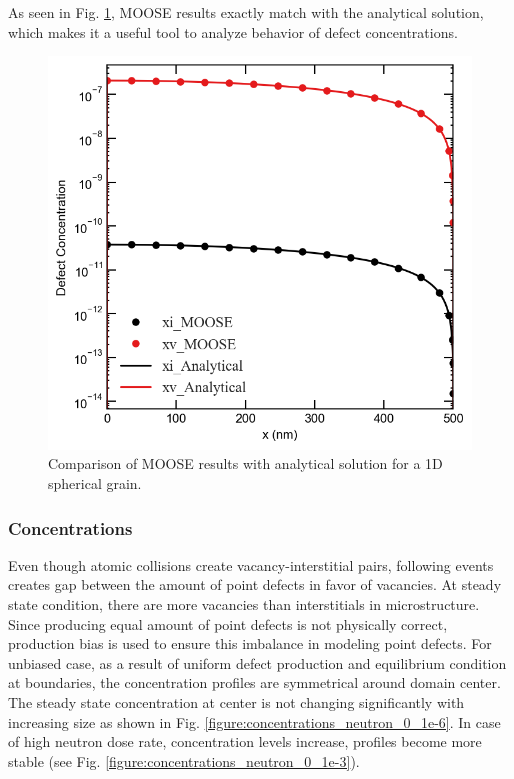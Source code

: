 \documentclass[a4paper]{article}
\begin{document}
  As seen in Fig. \ref{figure:concentrations_MOOSE_analytical}, MOOSE results exactly match with the analytical solution, which makes it a useful tool to analyze behavior of defect concentrations.
  \begin{figure}[h!]
    \centering
    \includegraphics[scale=0.55]{concentration_profiles_MOOSE_Analytical_Neutron_0}
    \caption{Comparison of MOOSE results with analytical solution for a 1D spherical grain.}
    \label{figure:concentrations_MOOSE_analytical}
  \end{figure}
    \subsubsection{Concentrations} \hspace{10pt}
    Even though atomic collisions create vacancy-interstitial pairs, following events creates gap between the amount of point defects in favor of vacancies. At steady state condition, there are more vacancies than interstitials in microstructure. Since producing equal amount of point defects is not physically correct, production bias is used to ensure this imbalance in modeling point defects. For unbiased case, as a result of uniform defect production and equilibrium condition at boundaries, the concentration profiles are symmetrical around domain center. The steady state concentration at center is not changing significantly with increasing size as shown in Fig. \ref{figure:concentrations_neutron_0_1e-6}. In case of high neutron dose rate, concentration levels increase, profiles become more stable (see Fig. \ref{figure:concentrations_neutron_0_1e-3}).\\
\end{document}
